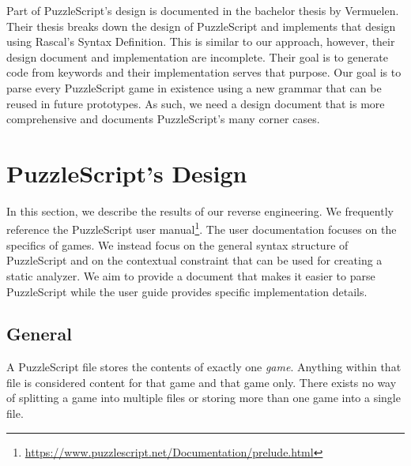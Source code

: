 Part of PuzzleScript's design is documented in the bachelor thesis by Vermuelen\cite{vermeulenautomated}. Their thesis breaks down the design of PuzzleScript and implements that design using Rascal's Syntax Definition. This is similar to our approach, however, their design document and implementation are incomplete. Their goal is to generate code from keywords and their implementation serves that purpose. Our goal is to parse every PuzzleScript game in existence using a new  grammar that can be reused in future prototypes. As such, we need a design document that is more comprehensive and documents PuzzleScript's many corner cases.


\section{PuzzleScript's Design}
In this section, we describe the results of our reverse engineering. We frequently reference the PuzzleScript user manual\footnote{\url{https://www.puzzlescript.net/Documentation/prelude.html}}. The user documentation focuses on the specifics of games. We instead focus on the general syntax structure of PuzzleScript and on the contextual constraint that can be used for creating a static analyzer. We aim to provide a document that makes it easier to parse PuzzleScript while the user guide provides specific implementation details.

\subsection{General}
A PuzzleScript file stores the contents of exactly one \emph{game}. Anything within that file is considered content for that game and that game only. There exists no way of splitting a game into multiple files or storing more than one game into a single file.

